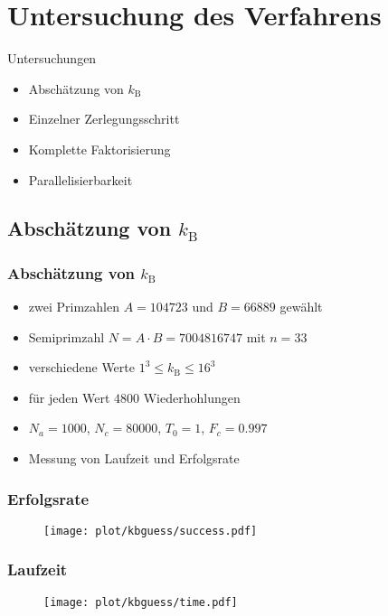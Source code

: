 \section{Untersuchung des Verfahrens}

\begin{frame}
  Untersuchungen
  \begin{itemize}
    \setlength{\itemsep}{0.3cm}

    \item Abschätzung von $k_\mathrm{B}$
    \item Einzelner Zerlegungsschritt
    \item Komplette Faktorisierung
    \item Parallelisierbarkeit
  \end{itemize}
\end{frame}

\subsection*{\texorpdfstring{Abschätzung von $k_\mathrm{B}$}{Abschätzung von kB}}
\begin{frame}
  \frametitle{Abschätzung von $k_\mathrm{B}$}
  \begin{itemize}
    \setlength{\itemsep}{0.3cm}

    \item zwei Primzahlen $A=104723$ und $B=66889$ gewählt
    \item Semiprimzahl $N=A\cdot B=7004816747$ mit $n=33$
    \pause{}
    \item verschiedene Werte $1^3\leq k_\mathrm{B}\leq 16^3$
    \item für jeden Wert $4800$ Wiederhohlungen
    \pause{}
    \item $N_a=1000$, $N_c=80000$, $T_0=1$, $F_c=0.997$
    \item Messung von Laufzeit und Erfolgsrate
  \end{itemize}
\end{frame}
\begin{frame}
  \frametitle{Erfolgsrate}
  \begin{figure}[H]
    \centering
    \texttt{[image: plot/kbguess/success.pdf]}
  \end{figure}
\end{frame}
\begin{frame}
  \frametitle{Laufzeit}
  \begin{figure}[H]
    \centering
    \texttt{[image: plot/kbguess/time.pdf]}
  \end{figure}
\end{frame}

